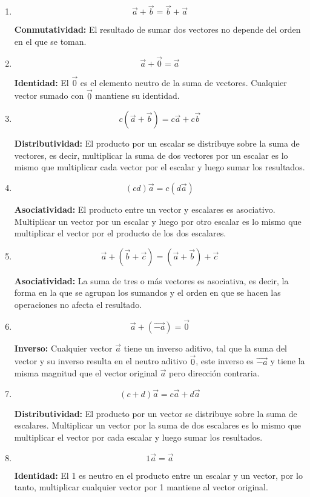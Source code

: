 \documentclass[12pt]{article}
\begin{document}
\begin{enumerate}[format=\textbf]

\item $$\vec{a}+\vec{b} = \vec{b}+\vec{a}$$
  
  \textbf{Conmutatividad:} El resultado de sumar dos vectores no depende del orden en el que se toman.

\item $$\vec{a}+\vec{0} = \vec{a}$$
  
  \textbf{Identidad:} El $\vec{0}$ es el elemento neutro de la suma de vectores. Cualquier vector sumado con $\vec{0}$ mantiene su identidad. 

\item $$c(\vec{a}+\vec{b}) = c\vec{a}+c\vec{b}$$
  
   \textbf{Distributividad:} El producto por un escalar se distribuye sobre la suma de vectores, es decir,  multiplicar la suma de dos vectores por un escalar es lo mismo que multiplicar cada vector por el escalar y luego sumar los resultados.

 \item $$(cd)\vec{a} = c(d\vec{a})$$
   
   \textbf{Asociatividad:} El producto entre un vector y escalares es asociativo. Multiplicar un vector por un escalar y luego por otro escalar es lo mismo que multiplicar el vector por el producto de los dos escalares.  

 \item $$\vec{a}+(\vec{b}+\vec{c}) = (\vec{a}+\vec{b})+\vec{c}$$
   
   \textbf{Asociatividad:} La suma de tres o más vectores es asociativa, es decir, la forma en la que se agrupan los sumandos  y el orden en que se hacen las operaciones no afecta el resultado.

 \item $$\vec{a}+(\vec{-a}) = \vec{0}$$
   
   \textbf{Inverso:} Cualquier vector $\vec{a}$ tiene un inverso aditivo, tal que la suma del vector y su inverso resulta en el neutro aditivo $\vec{0}$, este inverso es $\vec{-a}$ y tiene la misma magnitud que el vector original $\vec{a}$ pero dirección contraria.
   
\item $$(c+d)\vec{a} = c\vec{a}+d\vec{a}$$
  
  \textbf{Distributividad:} El producto por un vector se distribuye sobre la suma de escalares. Multiplicar un vector por la suma de dos escalares es lo mismo que multiplicar el vector por cada escalar y luego sumar los resultados.
  
\item $$1\vec{a} = \vec{a}$$
  
  \textbf{Identidad:} El 1 es neutro en el producto entre un escalar y un vector, por lo tanto, multiplicar cualquier vector por 1 mantiene al vector original.
  
\end{enumerate}
\end{document}
